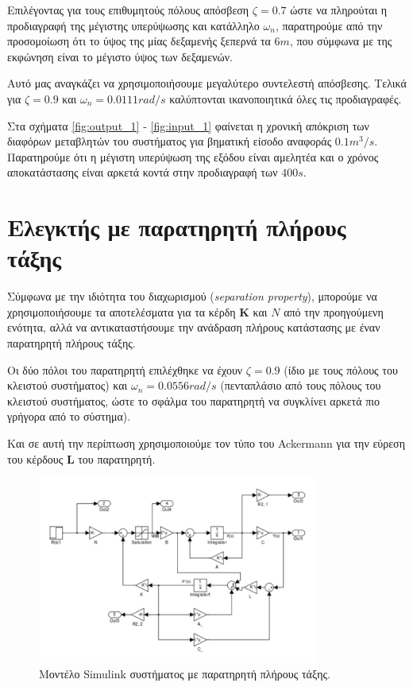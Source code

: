\documentclass[a4paper, 11pt, english, greek]{article}
\begin{document}
Επιλέγοντας για τους επιθυμητούς πόλους απόσβεση $\zeta = 0.7$ ώστε να πληρούται η προδιαγραφή της μέγιστης υπερύψωσης
και κατάλληλο $ω_n$, παρατηρούμε από την προσομοίωση ότι το ύψος της μίας δεξαμενής ξεπερνά τα $6m$,
που σύμφωνα με της εκφώνηση είναι το μέγιστο ύψος των δεξαμενών.

Αυτό μας αναγκάζει να χρησιμοποιήσουμε μεγαλύτερο συντελεστή απόσβεσης.
Τελικά για $\zeta = 0.9$ και $ω_n = 0.0111 rad/s$ καλύπτονται ικανοποιητικά όλες τις προδιαγραφές.

Στα σχήματα \ref{fig:output_1} - \ref{fig:input_1} φαίνεται η χρονική απόκριση των διαφόρων μεταβλητών του συστήματος για
βηματική είσοδο αναφοράς $0.1 m^3/s$. Παρατηρούμε ότι η μέγιστη υπερύψωση της εξόδου είναι αμελητέα και
ο χρόνος αποκατάστασης είναι αρκετά κοντά στην προδιαγραφή των $400s$.

\section{Ελεγκτής με παρατηρητή πλήρους τάξης}
Σύμφωνα με την ιδιότητα του διαχωρισμού (\textlatin{\emph{separation property}}),
μπορούμε να χρησιμοποιήσουμε τα αποτελέσματα για τα κέρδη $\mathbf{K}$ και $N$ από την προηγούμενη ενότητα,
αλλά να αντικαταστήσουμε την ανάδραση πλήρους κατάστασης με έναν παρατηρητή πλήρους τάξης.

Οι δύο πόλοι του παρατηρητή επιλέχθηκε να έχουν $\zeta = 0.9$ (ίδιο με τους πόλους του κλειστού συστήματος)
και $ω_n = 0.0556 rad/s$ (πενταπλάσιο από τους πόλους του κλειστού συστήματος,
ώστε το σφάλμα του παρατηρητή να συγκλίνει αρκετά πιο γρήγορα από το σύστημα).

Και σε αυτή την περίπτωση χρησιμοποιούμε τον τύπο του \textlatin{Ackermann} για την εύρεση του
κέρδους $\mathbf{L}$ του παρατηρητή.

\begin{figure}[h]
  \centering
  \includegraphics[width=350px]{full_obs}
  \caption{Μοντέλο \textlatin{Simulink} συστήματος με παρατηρητή πλήρους τάξης.}
  \label{fig:full_obs}
\end{figure}
\end{document}
